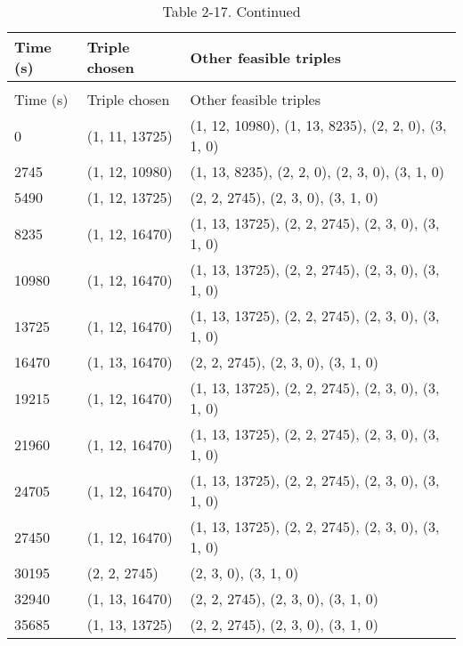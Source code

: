 \begin{longtable}[h!t!]{p{0.6in}p{1in}p{4.4in}}
    \caption{Duplicate of Previous table, using longtables environment.}\label{tbl2}\\%
    \hline {{Time (s)}} & {{Triple chosen}} & {{Other feasible triples}}\\ \hline \endfirsthead%
    \hline\endfoot%
    \caption*{Table 2-17. Continued} \\%
    \hline{{Time (s)}} & {{Triple chosen}} & {{Other feasible triples}}\\ \hline \endhead%
0 & (1, 11, 13725) & (1, 12, 10980), (1, 13, 8235), (2, 2, 0), (3, 1, 0)\\
2745 & (1, 12, 10980) & (1, 13, 8235), (2, 2, 0), (2, 3, 0), (3, 1, 0) \\
5490 & (1, 12, 13725) & (2, 2, 2745), (2, 3, 0), (3, 1, 0) \\
8235 & (1, 12, 16470) & (1, 13, 13725), (2, 2, 2745), (2, 3, 0), (3, 1, 0) \\
10980 & (1, 12, 16470) & (1, 13, 13725), (2, 2, 2745), (2, 3, 0), (3, 1, 0) \\
13725 & (1, 12, 16470) & (1, 13, 13725), (2, 2, 2745), (2, 3, 0), (3, 1, 0) \\
16470 & (1, 13, 16470) & (2, 2, 2745), (2, 3, 0), (3, 1, 0) \\
19215 & (1, 12, 16470) & (1, 13, 13725), (2, 2, 2745), (2, 3, 0), (3, 1, 0) \\
21960 & (1, 12, 16470) & (1, 13, 13725), (2, 2, 2745), (2, 3, 0), (3, 1, 0) \\
24705 & (1, 12, 16470) & (1, 13, 13725), (2, 2, 2745), (2, 3, 0), (3, 1, 0) \\
27450 & (1, 12, 16470) & (1, 13, 13725), (2, 2, 2745), (2, 3, 0), (3, 1, 0) \\
30195 & (2, 2, 2745) & (2, 3, 0), (3, 1, 0) \\
32940 & (1, 13, 16470) & (2, 2, 2745), (2, 3, 0), (3, 1, 0) \\
35685 & (1, 13, 13725) & (2, 2, 2745), (2, 3, 0), (3, 1, 0) \\

\end{longtable}
